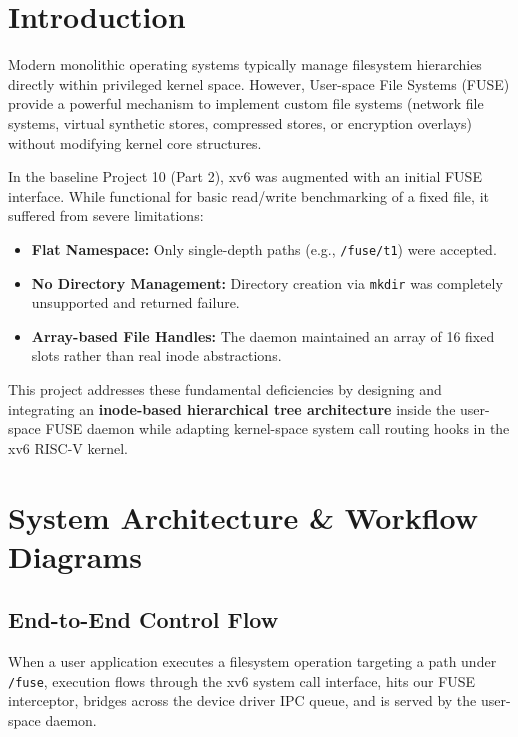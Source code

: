 \documentclass[11pt,a4paper]{article}
\begin{document}
\newpage
\tableofcontents
\newpage

\section{Introduction}
Modern monolithic operating systems typically manage filesystem hierarchies directly within privileged kernel space. However, User-space File Systems (FUSE) provide a powerful mechanism to implement custom file systems (network file systems, virtual synthetic stores, compressed stores, or encryption overlays) without modifying kernel core structures.

In the baseline Project 10 (Part 2), xv6 was augmented with an initial FUSE interface. While functional for basic read/write benchmarking of a fixed file, it suffered from severe limitations:
\begin{itemize}[noitemsep]
    \item \textbf{Flat Namespace:} Only single-depth paths (e.g., \texttt{/fuse/t1}) were accepted.
    \item \textbf{No Directory Management:} Directory creation via \texttt{mkdir} was completely unsupported and returned failure.
    \item \textbf{Array-based File Handles:} The daemon maintained an array of 16 fixed slots rather than real inode abstractions.
\end{itemize}

This project addresses these fundamental deficiencies by designing and integrating an \textbf{inode-based hierarchical tree architecture} inside the user-space FUSE daemon while adapting kernel-space system call routing hooks in the xv6 RISC-V kernel.

\section{System Architecture \& Workflow Diagrams}

\subsection{End-to-End Control Flow}
When a user application executes a filesystem operation targeting a path under \texttt{/fuse}, execution flows through the xv6 system call interface, hits our FUSE interceptor, bridges across the device driver IPC queue, and is served by the user-space daemon.
\end{document}
